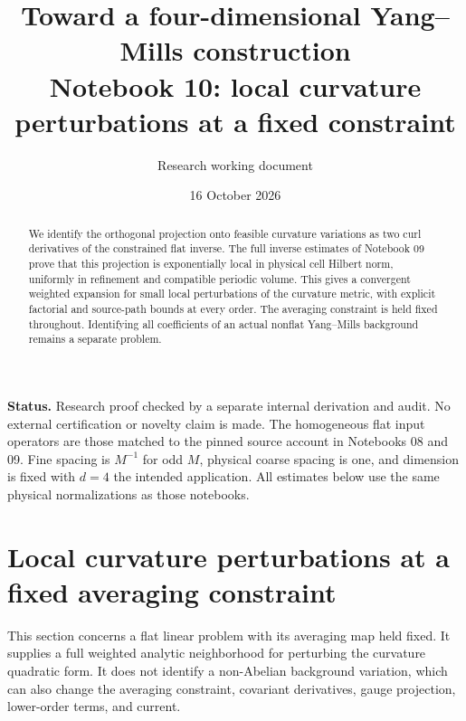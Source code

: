 \documentclass[11pt]{article}
\title{Toward a four-dimensional Yang--Mills construction\\
\large Notebook 10: local curvature perturbations at a fixed constraint}
\author{Research working document}
\date{16 October 2026}
\theoremstyle{remark}
\newcommand{\norm}[1]{\left\|#1\right\|}
\begin{document}
\maketitle
\begin{abstract}
We identify the orthogonal projection onto feasible curvature
variations as two curl derivatives of the constrained flat inverse.
The full inverse estimates of Notebook 09 prove that this projection
is exponentially local in physical cell Hilbert norm, uniformly in
refinement and compatible periodic volume. This gives a convergent
weighted expansion for small local perturbations of the curvature
metric, with explicit factorial and source-path bounds at every order.
The averaging constraint is held fixed throughout. Identifying all
coefficients of an actual nonflat Yang--Mills background remains a
separate problem.
\end{abstract}

\noindent\textbf{Status.}
Research proof checked by a separate internal derivation and audit.
No external certification or novelty claim is made. The homogeneous
flat input operators are those matched to the pinned source account
in Notebooks 08 and 09. Fine spacing is $M^{-1}$ for odd $M$,
physical coarse spacing is one, and dimension is fixed with $d=4$
the intended application. All estimates below use the same physical
normalizations as those notebooks.
\section{Local curvature perturbations at a fixed averaging constraint}
\label{curv-section}

This section concerns a flat linear problem with its averaging map held
fixed. It supplies a full weighted analytic neighborhood for perturbing
the curvature quadratic form. It does not identify a non-Abelian
background variation, which can also change the averaging constraint,
covariant derivatives, gauge projection, lower-order terms, and current.
\end{document}
